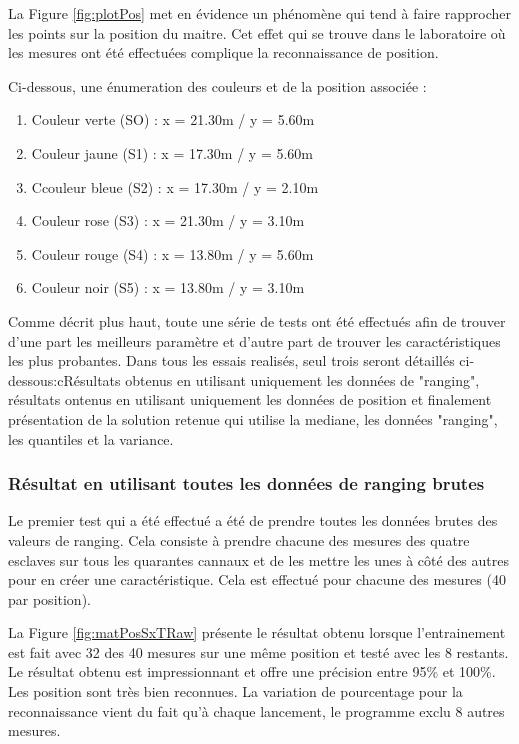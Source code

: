 La Figure \ref{fig:plotPos} met en évidence un phénomène qui tend à faire rapprocher les points sur la position du maitre. Cet effet qui se trouve dans le laboratoire où les mesures ont été effectuées complique la reconnaissance de position.

Ci-dessous, une énumeration des couleurs et de la position associée : 
\begin{enumerate}
	\item Couleur verte (SO) : x = 21.30m / y = 5.60m
	\item Couleur jaune (S1)  : x = 17.30m / y = 5.60m
	\item Ccouleur bleue (S2) : x = 17.30m / y = 2.10m
	\item Couleur rose (S3) : x = 21.30m / y = 3.10m
	\item Couleur rouge (S4) : x = 13.80m / y = 5.60m 
	\item Couleur noir (S5) : x = 13.80m / y = 3.10m 
\end{enumerate} 

Comme décrit plus haut, toute une série de tests ont été effectués afin de trouver d'une part les meilleurs paramètre et d'autre part de trouver les caractéristiques les plus probantes. Dans tous les essais realisés, seul trois seront détaillés ci-dessous:cRésultats obtenus en utilisant uniquement les données de "ranging", résultats ontenus en utilisant uniquement les données de position et finalement présentation de la solution retenue qui utilise la mediane, les données "ranging", les quantiles et la variance.

\subsubsection{Résultat en utilisant toutes les données de ranging brutes}
Le premier test qui a été effectué a été de prendre toutes les données brutes des valeurs de ranging. Cela consiste à prendre chacune des mesures des quatre esclaves sur tous les quarantes cannaux et de les mettre les unes à côté des autres pour en créer une caractéristique. Cela est effectué pour chacune des mesures (40 par position).  

La Figure \ref{fig:matPosSxTRaw} présente le résultat obtenu lorsque l'entrainement est fait avec 32 des 40 mesures sur une même position et testé avec les 8 restants. Le résultat obtenu est impressionnant et offre une précision entre 95\% et 100\%. Les position sont très bien reconnues. La variation de pourcentage pour la reconnaissance vient du fait qu'à chaque lancement, le programme exclu 8 autres mesures.

